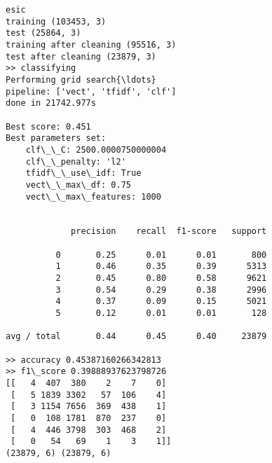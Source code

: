 \documentclass[11pt]{article}
\begin{document}
    \begin{Verbatim}[commandchars=\\\{\}]
esic
training (103453, 3)
test (25864, 3)
training after cleaning (95516, 3)
test after cleaning (23879, 3)
>> classifying
Performing grid search{\ldots}
pipeline: ['vect', 'tfidf', 'clf']
done in 21742.977s

Best score: 0.451
Best parameters set:
	clf\_\_C: 2500.0000750000004
	clf\_\_penalty: 'l2'
	tfidf\_\_use\_idf: True
	vect\_\_max\_df: 0.75
	vect\_\_max\_features: 1000


             precision    recall  f1-score   support

          0       0.25      0.01      0.01       800
          1       0.46      0.35      0.39      5313
          2       0.45      0.80      0.58      9621
          3       0.54      0.29      0.38      2996
          4       0.37      0.09      0.15      5021
          5       0.12      0.01      0.01       128

avg / total       0.44      0.45      0.40     23879

>> accuracy 0.45387160266342813
>> f1\_score 0.39888937623798726
[[   4  407  380    2    7    0]
 [   5 1839 3302   57  106    4]
 [   3 1154 7656  369  438    1]
 [   0  108 1781  870  237    0]
 [   4  446 3798  303  468    2]
 [   0   54   69    1    3    1]]
(23879, 6) (23879, 6)

    \end{Verbatim}

    \begin{center}
    \end{center}
    { \hspace*{\fill} \\}
    
    \begin{center}
    \end{center}
    { \hspace*{\fill} \\}
    
\end{document}
